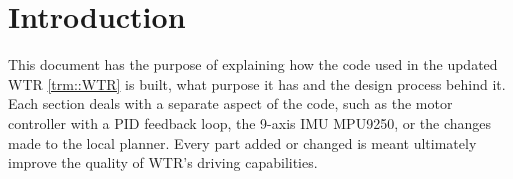 \section{Introduction}

This document has the purpose of explaining how the code used in the updated WTR \ref{trm::WTR} is built, what purpose it has and the design process behind it.
Each section deals with a separate aspect of the code, such as the motor controller with a PID feedback loop, the 9-axis IMU MPU9250, or the changes made to the local planner.
Every part added or changed is meant ultimately improve the quality of WTR's driving capabilities.

\newpage